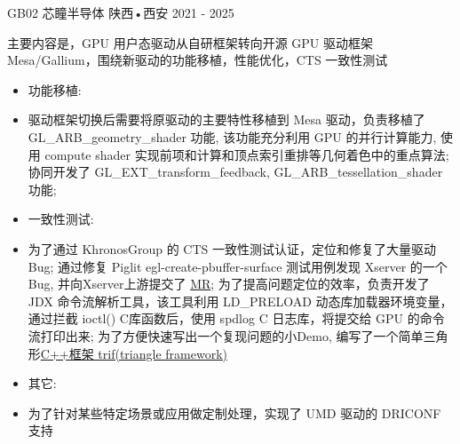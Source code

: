 
\begin{cventries}
  \cventry
    {GB02} %
    {芯瞳半导体} %
    {陕西•西安} %
    {2021 - 2025} %
    {
      \begin{cvitems} %
        \item {主要内容是，GPU 用户态驱动从自研框架转向开源 GPU 驱动框架 Mesa/Gallium，围绕新驱动的功能移植，性能优化，CTS 一致性测试
          \begin{itemize}
            \item 功能移植:
              \item[] 驱动框架切换后需要将原驱动的主要特性移植到 Mesa 驱动，负责移植了 GL\_ARB\_geometry\_shader 功能,
              该功能充分利用 GPU 的并行计算能力, 使用 compute shader 实现前项和计算和顶点索引重排等几何着色中的重点算法;\newline 
              协同开发了 GL\_EXT\_transform\_feedback, GL\_ARB\_tessellation\_shader 功能;\newline
            \item 一致性测试:
              \item[] 为了通过 KhronosGroup 的 CTS 一致性测试认证，定位和修复了大量驱动 Bug;\newline
              通过修复 Piglit egl-create-pbuffer-surface 测试用例发现 Xserver 的一个 Bug, 并向Xserver上游提交了
              \href{https://gitlab.freedesktop.org/xorg/xserver/-/merge_requests/1706}{MR};\newline
              为了提高问题定位的效率，负责开发了 JDX 命令流解析工具，该工具利用 LD\_PRELOAD 动态库加载器环境变量，通过拦截 ioctl()
              C库函数后，使用 spdlog C\+\+ 日志库，将提交给 GPU 的命令流打印出来;\newline
              为了方便快速写出一个复现问题的小Demo, 编写了一个简单三角形\href{https://github.com/lucmann/trif}{C++框架 trif(triangle framework)}
            \item 其它:
              \item[] 为了针对某些特定场景或应用做定制处理，实现了 UMD 驱动的 DRICONF 支持
          \end{itemize}
        }
      \end{cvitems}
    }
\end{cventries}

